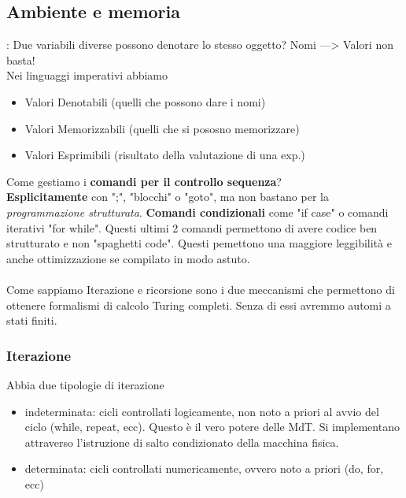 \documentclass[a4paper,12pt]{article}
\begin{document}
\subsection*{Ambiente e memoria}: Due variabili diverse possono denotare lo stesso oggetto? Nomi ---> Valori non basta!\\
Nei linguaggi imperativi abbiamo
\begin{itemize}
  \item Valori Denotabili (quelli che possono dare i nomi)
  \item Valori Memorizzabili (quelli che si pososno memorizzare)
  \item Valori Esprimibili (risultato della valutazione di una exp.)
\end{itemize}
Come gestiamo i \textbf{comandi per il controllo sequenza}? \\
\textbf{Esplicitamente} con ";", "blocchi" o "goto", ma non bastano per la \textit{programmazione strutturata}. \textbf{Comandi condizionali} come "if case" o comandi iterativi "for while". Questi ultimi 2 comandi permettono di avere codice ben strutturato e non "spaghetti code". Questi pemettono una maggiore leggibilità e anche ottimizzazione se compilato in modo astuto. \\
\vspace{1px}\\
Come sappiamo Iterazione e ricorsione sono i due meccanismi che permettono di ottenere formalismi di calcolo Turing completi. Senza di essi avremmo automi a stati finiti.
\subsubsection{Iterazione}
Abbia due tipologie di iterazione
\begin{itemize}
  \item indeterminata: cicli controllati logicamente, non noto a priori al avvio del ciclo (while, repeat, ecc). Questo è il vero potere delle MdT. Si implementano attraverso l’istruzione di salto condizionato della macchina fisica.
  \item determinata: cicli controllati numericamente, ovvero noto a priori (do, for, ecc)
\end{itemize}
\end{document}
